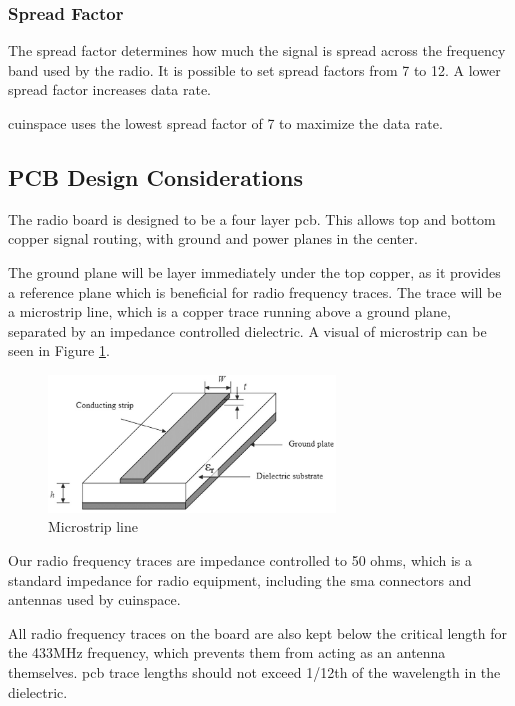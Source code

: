 \subsubsection{Spread Factor}

The spread factor determines how much the signal is spread across the frequency band used by the radio. It is possible
to set spread factors from 7 to 12. \cite[Sec. 2.5.5.14]{rn2483-commands} A lower spread factor increases data rate.

\Gls{cuinspace} uses the lowest spread factor of 7 to maximize the data rate.

\subsection{PCB Design Considerations}

The radio board is designed to be a four layer \gls{pcb}. This allows top and bottom copper signal routing, with ground
and power planes in the center.

The ground plane will be layer immediately under the top copper, as it provides a reference plane which is beneficial
for radio frequency traces. The trace will be a microstrip line, which is a copper trace running above a ground plane,
separated by an impedance controlled dielectric. A visual of microstrip can be seen in Figure \ref{fig:microstrip}.

\begin{figure}[H]
    \centering
    \includegraphics[width=3in]{assets/images/microstrip.png}
    \caption{Microstrip line \cite{microstrip}}
    \label{fig:microstrip}
\end{figure}

Our radio frequency traces are impedance controlled to 50 ohms, which is a standard impedance for radio equipment,
including the \gls{sma} connectors and antennas used by \gls{cuinspace}.

All radio frequency traces on the board are also kept below the critical length for the 433MHz frequency, which
prevents them from acting as an antenna themselves. \Gls{pcb} trace lengths should not exceed 1/12th of the wavelength
in the dielectric. \cite{critical-length}

